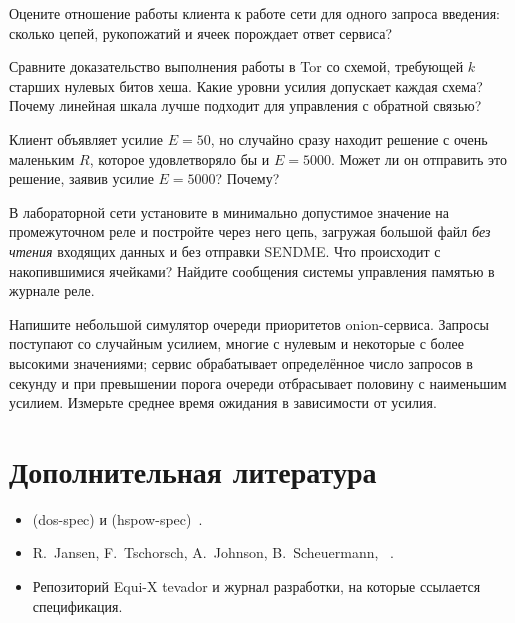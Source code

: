 \begin{esercizio}[2]\label{es:15-amplificazione}
Оцените отношение работы клиента к работе сети для одного запроса введения: сколько цепей, рукопожатий и ячеек порождает ответ сервиса?
\end{esercizio}

\begin{esercizio}[2]\label{es:15-bit}
Сравните доказательство выполнения работы в Tor со схемой, требующей $k$ старших нулевых битов хеша. Какие уровни усилия допускает каждая схема? Почему линейная шкала лучше подходит для управления с обратной связью?
\end{esercizio}

\begin{esercizio}[2]\label{es:15-sforzo}
Клиент объявляет усилие $E = 50$, но случайно сразу находит решение с очень маленьким $R$, которое удовлетворяло бы и $E = 5000$. Может ли он отправить это решение, заявив усилие $E = 5000$? Почему?
\end{esercizio}

\begin{esercizio}[3]\label{es:15-oom}
В лабораторной сети установите  в минимально допустимое значение на промежуточном реле и постройте через него цепь, загружая большой файл \emph{без чтения} входящих данных и без отправки SENDME. Что происходит с накопившимися ячейками? Найдите сообщения системы управления памятью в журнале реле.
\end{esercizio}

\begin{esercizio}[3]\label{es:15-coda}
Напишите небольшой симулятор очереди приоритетов onion-сервиса. Запросы поступают со случайным усилием, многие с нулевым и некоторые с более высокими значениями; сервис обрабатывает определённое число запросов в секунду и при превышении порога очереди отбрасывает половину с наименьшим усилием. Измерьте среднее время ожидания в зависимости от усилия.
\end{esercizio}

\section*{Дополнительная литература}
\begin{itemize}
  \item {} (dos-spec) и  (hspow-spec)~\cite{torspec}.
  \item R.~Jansen, F.~Tschorsch, A.~Johnson, B.~Scheuermann, ~\cite{jansen2014sniper}.
  \item Репозиторий Equi-X tevador и журнал разработки, на которые ссылается спецификация.
\end{itemize}
